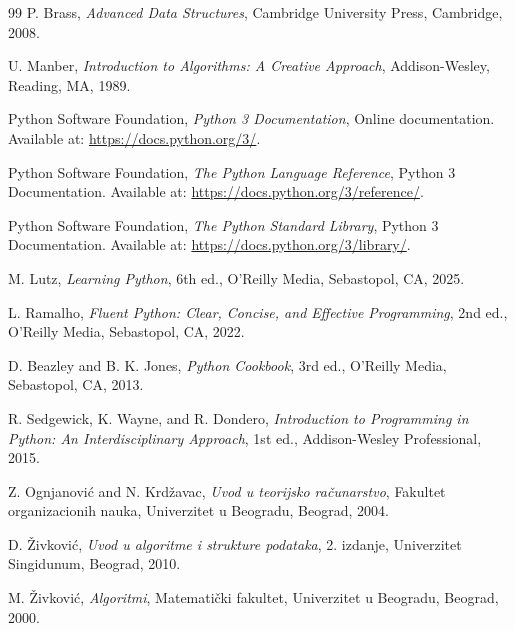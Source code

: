 \documentclass[b5paper, utf8, 11pt, colorlinks]{book}
\begin{document}
\begin{thebibliography}{99}
	P. Brass,
	\textit{Advanced Data Structures},
	Cambridge University Press, Cambridge, 2008.
	
	U. Manber,
	\textit{Introduction to Algorithms: A Creative Approach},
	Addison-Wesley, Reading, MA, 1989.
	
	
	
	Python Software Foundation,
	\textit{Python 3 Documentation},
	Online documentation.
	Available at:
	\url{https://docs.python.org/3/}.
	
	Python Software Foundation,
	\textit{The Python Language Reference},
	Python 3 Documentation.
	Available at:
	\url{https://docs.python.org/3/reference/}.
	
	Python Software Foundation,
	\textit{The Python Standard Library},
	Python 3 Documentation.
	Available at:
	\url{https://docs.python.org/3/library/}.
	
	M. Lutz,
	\textit{Learning Python},
	6th ed.,
	O'Reilly Media, Sebastopol, CA, 2025.
	
	L. Ramalho,
	\textit{Fluent Python: Clear, Concise, and Effective Programming},
	2nd ed.,
	O'Reilly Media, Sebastopol, CA, 2022.
	
	D. Beazley and B. K. Jones,
	\textit{Python Cookbook},
	3rd ed.,
	O'Reilly Media, Sebastopol, CA, 2013.
	
	R. Sedgewick, K. Wayne, and R. Dondero,
	\textit{Introduction to Programming in Python:
		An Interdisciplinary Approach},
	1st ed.,
	Addison-Wesley Professional, 2015.
	
	
	
	Z. Ognjanović and N. Krdžavac,
	\textit{Uvod u teorijsko računarstvo},
	Fakultet organizacionih nauka,
	Univerzitet u Beogradu, Beograd, 2004.
	
	D. Živković,
	\textit{Uvod u algoritme i strukture podataka},
	2. izdanje,
	Univerzitet Singidunum, Beograd, 2010.
	
	M. Živković,
	\textit{Algoritmi},
	Matematički fakultet,
	Univerzitet u Beogradu, Beograd, 2000.
	

\end{thebibliography}
\end{document}
